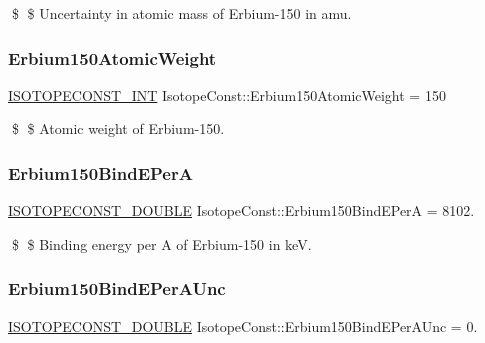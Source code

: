 \$ \$ Uncertainty in atomic mass of Erbium-\/150 in amu. \mbox{\label{group___isotope_const-_erbium-_er150_gafafb2c8cc373ddf6e4c3c97c235804b5}} 
\subsubsection{\texorpdfstring{Erbium150\+Atomic\+Weight}{Erbium150AtomicWeight}}
{\footnotesize\ttfamily \mbox{\hyperlink{group___isotope_const-_macros_ga5f18360b3e99483a35c32d789e62621c}{I\+S\+O\+T\+O\+P\+E\+C\+O\+N\+S\+T\+\_\+\+I\+NT}} Isotope\+Const\+::\+Erbium150\+Atomic\+Weight = 150}

\$ \$ Atomic weight of Erbium-\/150. \mbox{\label{group___isotope_const-_erbium-_er150_ga28b4fc80789457f12545a87dbcedf587}} 
\subsubsection{\texorpdfstring{Erbium150\+Bind\+E\+PerA}{Erbium150BindEPerA}}
{\footnotesize\ttfamily \mbox{\hyperlink{group___isotope_const-_macros_ga8f45a7272ce02c0b4c65c44636ed719a}{I\+S\+O\+T\+O\+P\+E\+C\+O\+N\+S\+T\+\_\+\+D\+O\+U\+B\+LE}} Isotope\+Const\+::\+Erbium150\+Bind\+E\+PerA = 8102.}

\$ \$ Binding energy per A of Erbium-\/150 in keV. \mbox{\label{group___isotope_const-_erbium-_er150_gaaae7087e05c895130c368d9472ebc164}} 
\subsubsection{\texorpdfstring{Erbium150\+Bind\+E\+Per\+A\+Unc}{Erbium150BindEPerAUnc}}
{\footnotesize\ttfamily \mbox{\hyperlink{group___isotope_const-_macros_ga8f45a7272ce02c0b4c65c44636ed719a}{I\+S\+O\+T\+O\+P\+E\+C\+O\+N\+S\+T\+\_\+\+D\+O\+U\+B\+LE}} Isotope\+Const\+::\+Erbium150\+Bind\+E\+Per\+A\+Unc = 0.}

